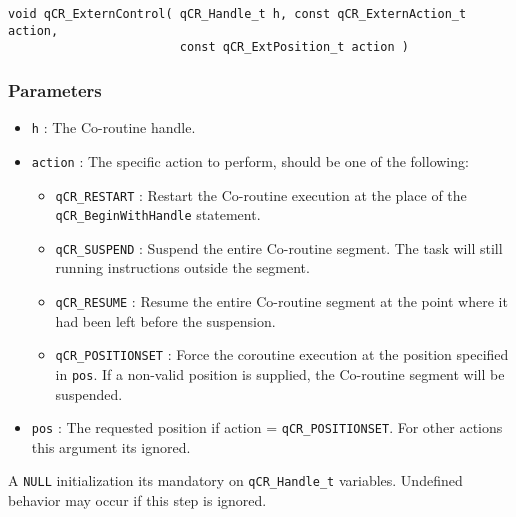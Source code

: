 \begin{lstlisting}[style=CStyle]
void qCR_ExternControl( qCR_Handle_t h, const qCR_ExternAction_t action,  
                        const qCR_ExtPosition_t action )                      
\end{lstlisting}

\subsubsection*{Parameters}
\begin{itemize}
    \item \lstinline{h} : The Co-routine handle.
    \item \lstinline{action} : The specific action to perform, should be one of the following:
    \begin{itemize}
        \item \lstinline{qCR_RESTART} : Restart the Co-routine execution at the place of the \lstinline{qCR_BeginWithHandle} statement.  
        \item \lstinline{qCR_SUSPEND} :  Suspend the entire Co-routine segment. The task will still running instructions outside the segment.
        \item \lstinline{qCR_RESUME} : Resume the entire Co-routine segment at the point where it had been left before the suspension.
        \item \lstinline{qCR_POSITIONSET} : Force the coroutine execution at the position specified in \lstinline{pos}. If a non-valid position is supplied, the Co-routine segment will be suspended.      
    \end{itemize}
    \item \lstinline{pos} : The requested position if action = \lstinline{qCR_POSITIONSET}. For other actions this argument its ignored.  
\end{itemize}

\hrulefill
\medskip

\begin{tcolorbox}
\HandRight A \lstinline{NULL} initialization its mandatory on \lstinline{qCR_Handle_t} variables. Undefined behavior may occur if this step is ignored.
\end{tcolorbox}